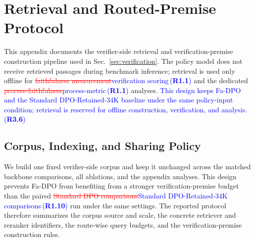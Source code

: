 \documentclass[a4paper,fleqn,doubleblind]{cas-sc}
\DeclareRobustCommand{\deleted}[1]{\textcolor{red}{\sout{#1}}}
\DeclareRobustCommand{\added}[1]{\textcolor{blue}{#1}}
\DeclareRobustCommand{\revtag}[1]{\textcolor{blue}{\scriptsize\,(\textbf{#1})}}
\begin{document}
\section{Retrieval and Routed-Premise Protocol}
\label{app:retrieval_protocol}

This appendix documents the verifier-side retrieval and verification-premise construction pipeline used in Sec.~\ref{sec:verification}. The policy model does not receive retrieved passages during benchmark inference; retrieval is used only offline for \deleted{faithfulness measurement}\added{verification scoring}\revtag{R1.1} and the dedicated \deleted{process-faithfulness}\added{process-metric}\revtag{R1.1} analyses. \added{This design keeps Fa-DPO and the Standard DPO-Retained-34K baseline under the same policy-input condition; retrieval is reserved for offline construction, verification, and analysis.}\revtag{R3.6}

\subsection{Corpus, Indexing, and Sharing Policy}

We build one fixed verifier-side corpus and keep it unchanged across the matched backbone comparisons, all ablations, and the appendix analyses. This design prevents Fa-DPO from benefiting from a stronger verification-premise budget than the paired \deleted{Standard DPO comparisons}\added{Standard DPO-Retained-34K comparisons}\revtag{R1.10} run under the same settings. The reported protocol therefore summarizes the corpus source and scale, the concrete retriever and reranker identifiers, the route-wise query budgets, and the verification-premise construction rules.
\end{document}
